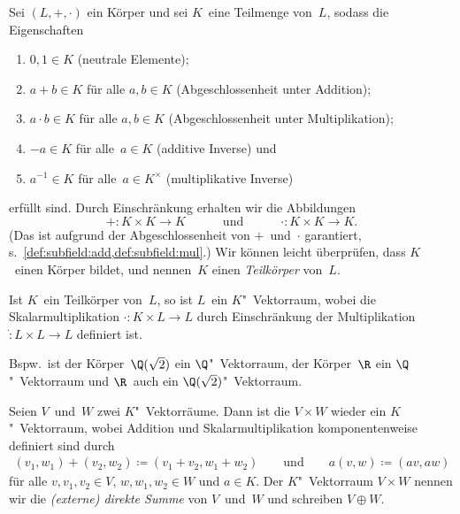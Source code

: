 \documentclass[a4paper]{article}
\begin{document}
\begin{definition}[Teilkörper]
    Sei $(L,+,\cdot)$ ein Körper und sei $K$~eine Teilmenge von~$L$, sodass die Eigenschaften
    \begin{enumerate}
        \item $0, 1 \in K$ (neutrale Elemente);
        \item $a+b \in K$ für alle $a,b \in K$ (Abgeschlossenheit unter Addition);\label{def:subfield:add}
        \item $a\cdot b \in K$ für alle $a,b \in K$ (Abgeschlossenheit unter Multiplikation);\label{def:subfield:mul}
        \item $-a \in K$ für alle~$a \in K$ (additive Inverse) und
        \item $a^{-1} \in K$ für alle~$a \in K^\times$ (multiplikative Inverse)
    \end{enumerate}
    erfüllt sind. Durch Einschränkung erhalten wir die Abbildungen
    \begin{equation*}
        +\colon K\times K \to K \quad\qquad\text{und}\qquad\quad \cdot\colon K\times K \to K.
    \end{equation*}
    (Das ist aufgrund der Abgeschlossenheit von $+$~und~$\cdot$ garantiert, s.~\cref{def:subfield:add,def:subfield:mul}.) Wir können leicht überprüfen, dass $K$~einen Körper bildet, und nennen~$K$ einen \emph{Teilkörper} von~$L$.
\end{definition}

\begin{example}
    Ist $K$~ein Teilkörper von~$L$, so ist $L$~ein $K$"~Vektorraum, wobei die Skalarmultiplikation $\cdot\colon K\times L \to L$ durch Einschränkung der Multiplikation $\dot\colon L\times L \to L$ definiert ist.

    Bspw.\ ist der Körper~$\Q(\sqrt{2})$ ein $\Q$"~Vektorraum, der Körper~$\R$ ein $\Q$"~Vektorraum und $\R$~auch ein $\Q(\sqrt{2})$"~Vektorraum.
\end{example}

\begin{definition}
    Seien $V$~und~$W$ zwei $K$"~Vektorräume. Dann ist die $V \times W$ wieder ein $K$"~Vektorraum, wobei Addition und Skalarmultiplikation komponentenweise definiert sind durch
    \begin{gather*}
        (v_1,w_1) + (v_2,w_2) \coloneqq (v_1+v_2, w_1+w_2) \qquad\text{und}\qquad a(v,w) \coloneqq (av, aw)
    \end{gather*}
    für alle $v,v_1,v_2 \in V$, $w,w_1,w_2 \in W$ und $a \in K$. Der $K$"~Vektorraum $V \times W$ nennen wir die \emph{(externe) direkte Summe} von $V$~und~$W$ und schreiben $V \oplus W$.
\end{definition}
\end{document}

